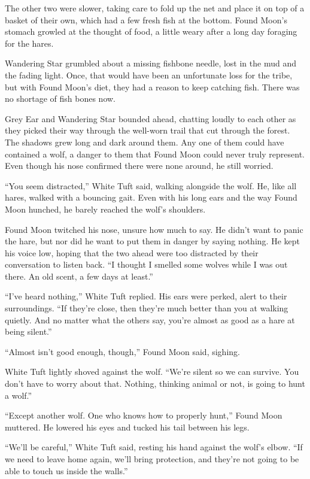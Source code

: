 The other two were slower, taking care to fold up the net and place it on top of a basket of their own, which had a few fresh fish at the bottom. Found Moon's stomach growled at the thought of food, a little weary after a long day foraging for the hares.

Wandering Star grumbled about a missing fishbone needle, lost in the mud and the fading light. Once, that would have been an unfortunate loss for the tribe, but with Found Moon's diet, they had a reason to keep catching fish. There was no shortage of fish bones now.

Grey Ear and Wandering Star bounded ahead, chatting loudly to each other as they picked their way through the well-worn trail that cut through the forest. The shadows grew long and dark around them. Any one of them could have contained a wolf, a danger to them that Found Moon could never truly represent. Even though his nose confirmed there were none around, he still worried.

``You seem distracted,'' White Tuft said, walking alongside the wolf. He, like all hares, walked with a bouncing gait. Even with his long ears and the way Found Moon hunched, he barely reached the wolf's shoulders.

Found Moon twitched his nose, unsure how much to say. He didn't want to panic the hare, but nor did he want to put them in danger by saying nothing. He kept his voice low, hoping that the two ahead were too distracted by their conversation to listen back. ``I thought I smelled some wolves while I was out there. An old scent, a few days at least.''

``I've heard nothing,'' White Tuft replied. His ears were perked, alert to their surroundings. ``If they're close, then they're much better than you at walking quietly. And no matter what the others say, you're almost as good as a hare at being silent.''

``Almost isn't good enough, though,'' Found Moon said, sighing.

White Tuft lightly shoved against the wolf. ``We're silent so we can survive. You don't have to worry about that. Nothing, thinking animal or not, is going to hunt a wolf.''

``Except another wolf. One who knows how to properly hunt,'' Found Moon muttered. He lowered his eyes and tucked his tail between his legs.

``We'll be careful,'' White Tuft said, resting his hand against the wolf's elbow. ``If we need to leave home again, we'll bring protection, and they're not going to be able to touch us inside the walls.''

